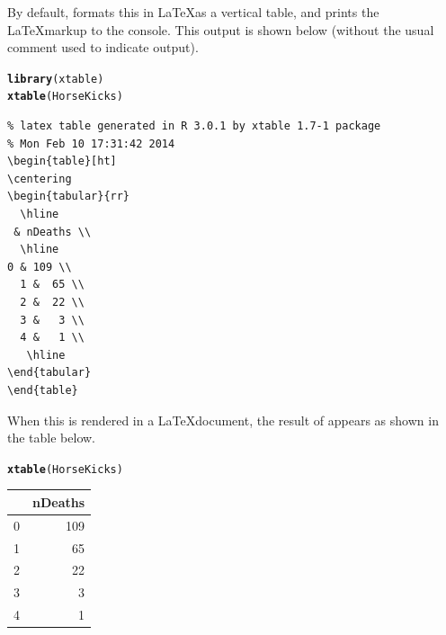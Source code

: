 \documentclass[11pt]{book}\usepackage[]{graphicx}\usepackage[]{color}
\makeatletter
\newcommand{\hlstd}[1]{\textcolor[rgb]{0.345,0.345,0.345}{#1}}%
\newcommand{\hlkwd}[1]{\textcolor[rgb]{0.737,0.353,0.396}{\textbf{#1}}}%
\newenvironment{kframe}{%
 \def\at@end@of@kframe{}%
 \ifinner\ifhmode%
  \def\at@end@of@kframe{\end{minipage}}%
  \begin{minipage}{\columnwidth}%
 \fi\fi%
 \def\FrameCommand##1{\hskip\@totalleftmargin \hskip-\fboxsep
 \colorbox{shadecolor}{##1}\hskip-\fboxsep
     \hskip-\linewidth \hskip-\@totalleftmargin \hskip\columnwidth}%
 \MakeFramed {\advance\hsize-\width
   \@totalleftmargin\z@ \linewidth\hsize
   \@setminipage}}%
 {\par\unskip\endMakeFramed%
 \at@end@of@kframe}
\newenvironment{knitrout}{}{} %
\renewenvironment{knitrout}{\small\renewcommand{\baselinestretch}{.85}}{} %
\makeatother
\begin{document}
By default,  formats this in \LaTeX as a vertical table,
and prints the \LaTeX markup to the \R console.  This output is shown
below (without the usual \code{\#\#} comment used to indicate \R output).
\begin{knitrout}
\color{fgcolor}\begin{kframe}
\begin{alltt}
\hlkwd{library}\hlstd{(xtable)}
\hlkwd{xtable}\hlstd{(HorseKicks)}
\end{alltt}
\begin{verbatim}
% latex table generated in R 3.0.1 by xtable 1.7-1 package
% Mon Feb 10 17:31:42 2014
\begin{table}[ht]
\centering
\begin{tabular}{rr}
  \hline
 & nDeaths \\ 
  \hline
0 & 109 \\ 
  1 &  65 \\ 
  2 &  22 \\ 
  3 &   3 \\ 
  4 &   1 \\ 
   \hline
\end{tabular}
\end{table}
\end{verbatim}
\end{kframe}
\end{knitrout}

When this is rendered in a \LaTeX document, the result of 
appears as shown in the table below.
\begin{kframe}
\begin{alltt}
\hlkwd{xtable}\hlstd{(HorseKicks)}
\end{alltt}
\end{kframe}%
\begin{table}[ht]
\centering
\begin{tabular}{rr}
  \hline
 & nDeaths \\ 
  \hline
0 & 109 \\ 
  1 &  65 \\ 
  2 &  22 \\ 
  3 &   3 \\ 
  4 &   1 \\ 
   \hline
\end{tabular}
\end{table}
\end{document}
